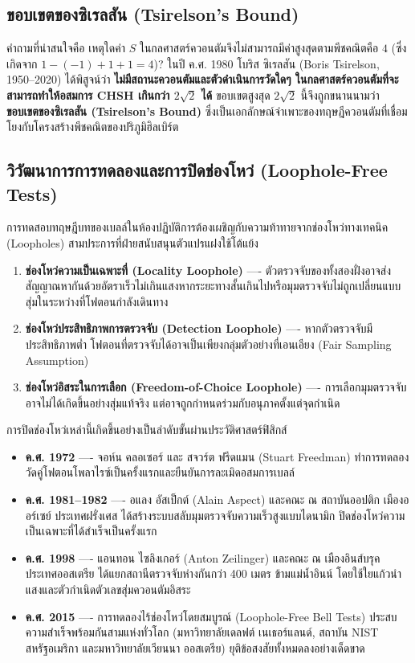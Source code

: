 \subsection{ขอบเขตของซิเรลสัน (Tsirelson's Bound)}
คำถามที่น่าสนใจคือ เหตุใดค่า $S$ ในกลศาสตร์ควอนตัมจึงไม่สามารถมีค่าสูงสุดตามพีชคณิตคือ $4$ (ซึ่งเกิดจาก $1 - (-1) + 1 + 1 = 4$)? ในปี ค.ศ. 1980 โบริส ซิเรลสัน (Boris Tsirelson, 1950--2020) ได้พิสูจน์ว่า \textbf{ไม่มีสถานะควอนตัมและตัวดำเนินการวัดใดๆ ในกลศาสตร์ควอนตัมที่จะสามารถทำให้อสมการ CHSH เกินกว่า $2\sqrt{2}$ ได้} ขอบเขตสูงสุด $2\sqrt{2}$ นี้จึงถูกขนานนามว่า \textbf{ขอบเขตของซิเรลสัน (Tsirelson's Bound)} ซึ่งเป็นเอกลักษณ์จำเพาะของทฤษฎีควอนตัมที่เชื่อมโยงกับโครงสร้างพีชคณิตของปริภูมิฮิลเบิร์ต

\subsection{วิวัฒนาการการทดลองและการปิดช่องโหว่ (Loophole-Free Tests)}
การทดสอบทฤษฎีบทของเบลล์ในห้องปฏิบัติการต้องเผชิญกับความท้าทายจากช่องโหว่ทางเทคนิค (Loopholes) สามประการที่ฝ่ายสนับสนุนตัวแปรแฝงใช้โต้แย้ง
\begin{enumerate}
    \item \textbf{ช่องโหว่ความเป็นเฉพาะที่ (Locality Loophole)} ---- ตัวตรวจจับของทั้งสองฝั่งอาจส่งสัญญาณหากันด้วยอัตราเร็วไม่เกินแสงหากระยะทางสั้นเกินไปหรือมุมตรวจจับไม่ถูกเปลี่ยนแบบสุ่มในระหว่างที่โฟตอนกำลังเดินทาง
    \item \textbf{ช่องโหว่ประสิทธิภาพการตรวจจับ (Detection Loophole)} ---- หากตัวตรวจจับมีประสิทธิภาพต่ำ โฟตอนที่ตรวจจับได้อาจเป็นเพียงกลุ่มตัวอย่างที่เอนเอียง (Fair Sampling Assumption)
    \item \textbf{ช่องโหว่อิสระในการเลือก (Freedom-of-Choice Loophole)} ---- การเลือกมุมตรวจจับอาจไม่ได้เกิดขึ้นอย่างสุ่มแท้จริง แต่อาจถูกกำหนดร่วมกับอนุภาคตั้งแต่จุดกำเนิด
\end{enumerate}

การปิดช่องโหว่เหล่านี้เกิดขึ้นอย่างเป็นลำดับขั้นผ่านประวัติศาสตร์ฟิสิกส์
\begin{itemize}
    \item \textbf{ค.ศ. 1972} ---- จอห์น คลอเซอร์ และ สจวร์ต ฟรีดแมน (Stuart Freedman) ทำการทดลองวัดคู่โฟตอนโพลาไรซ์เป็นครั้งแรกและยืนยันการละเมิดอสมการเบลล์
    \item \textbf{ค.ศ. 1981--1982} ---- อแลง อัสเป็กต์ (Alain Aspect) และคณะ ณ สถาบันออปติก เมืองออร์เซย์ ประเทศฝรั่งเศส ได้สร้างระบบสลับมุมตรวจจับความเร็วสูงแบบไดนามิก ปิดช่องโหว่ความเป็นเฉพาะที่ได้สำเร็จเป็นครั้งแรก
    \item \textbf{ค.ศ. 1998} ---- แอนทอน ไซลิงเกอร์ (Anton Zeilinger) และคณะ ณ เมืองอินส์บรุค ประเทศออสเตรีย ได้แยกสถานีตรวจจับห่างกันกว่า 400 เมตร ข้ามแม่น้ำอินน์ โดยใช้ใยแก้วนำแสงและตัวกำเนิดตัวเลขสุ่มควอนตัมอิสระ
    \item \textbf{ค.ศ. 2015} ---- การทดลองไร้ช่องโหว่โดยสมบูรณ์ (Loophole-Free Bell Tests) ประสบความสำเร็จพร้อมกันสามแห่งทั่วโลก (มหาวิทยาลัยเดลฟต์ เนเธอร์แลนด์, สถาบัน NIST สหรัฐอเมริกา และมหาวิทยาลัยเวียนนา ออสเตรีย) ยุติข้อสงสัยทั้งหมดลงอย่างเด็ดขาด
\end{itemize}

